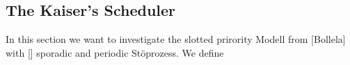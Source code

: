 \subsection{The Kaiser's Scheduler}


In this section we want to investigate the slotted prirority Modell from [Bollela] with [] sporadic and periodic Stöprozess.
We define  	    
   
   
   
